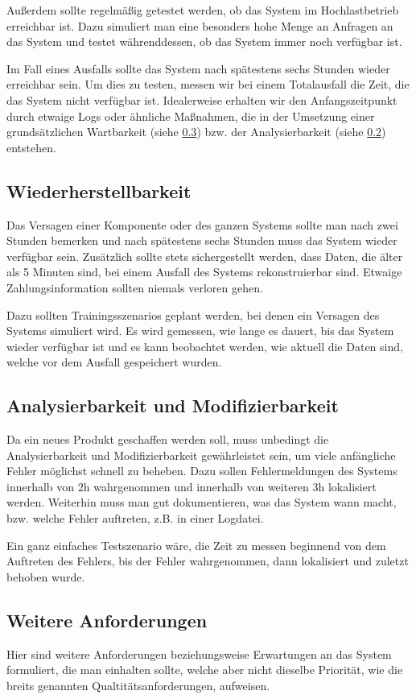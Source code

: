Außerdem sollte regelmäßig getestet werden, ob das System im Hochlastbetrieb erreichbar ist.
Dazu simuliert man eine besonders hohe Menge an Anfragen an das System und testet währenddessen,
ob das System immer noch verfügbar ist.

Im Fall eines Ausfalls sollte das System nach spätestens sechs Stunden wieder erreichbar sein.
Um dies zu testen, messen wir bei einem Totalausfall die Zeit, die das System nicht verfügbar ist.
Idealerweise erhalten wir den Anfangszeitpunkt durch etwaige Logs oder ähnliche Maßnahmen,
die in der Umsetzung einer grundsätzlichen Wartbarkeit (siehe \ref{sec:other})
bzw. der Analysierbarkeit (siehe \ref{sec:anal}) entstehen.

\subsection{Wiederherstellbarkeit}
Das Versagen einer Komponente oder des ganzen Systems sollte man nach zwei Stunden bemerken
und nach spätestens sechs Stunden muss das System wieder verfügbar sein.
Zusätzlich sollte stets sichergestellt werden, dass Daten, die älter als 5 Minuten sind,
bei einem Ausfall des Systems rekonstruierbar sind.
Etwaige Zahlungsinformation sollten niemals verloren gehen.

Dazu sollten Trainingsszenarios geplant werden, bei denen ein Versagen des Systems simuliert wird.
Es wird gemessen, wie lange es dauert, bis das System wieder verfügbar ist und es kann beobachtet werden,
wie aktuell die Daten sind, welche vor dem Ausfall gespeichert wurden.


\subsection{Analysierbarkeit und Modifizierbarkeit} \label{sec:anal} %
Da ein neues Produkt geschaffen werden soll, muss unbedingt die Analysierbarkeit und Modifizierbarkeit gewährleistet
sein, um viele anfängliche Fehler möglichst schnell zu beheben.
Dazu sollen Fehlermeldungen des Systems innerhalb von 2h wahrgenommen und innerhalb von weiteren 3h lokalisiert werden.
Weiterhin muss man gut dokumentieren, was das System wann macht, bzw. welche Fehler auftreten, z.B. in einer Logdatei.

Ein ganz einfaches Testszenario wäre, die Zeit zu messen beginnend von dem Auftreten des Fehlers,
bis der Fehler wahrgenommen, dann lokalisiert und zuletzt behoben wurde.


\subsection{Weitere Anforderungen} \label{sec:other}
Hier sind weitere Anforderungen beziehungsweise Erwartungen an das System formuliert,
die man einhalten sollte, welche aber nicht dieselbe Priorität, wie die breits genannten Qualtitätsanforderungen, aufweisen.
